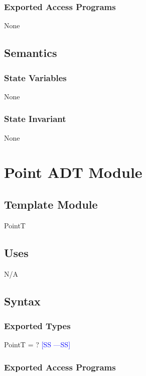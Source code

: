\documentclass[12pt]{article}
\newcommand{\authornote}[3]{\textcolor{#1}{[#3 ---#2]}}
\newcommand{\authornote}[3]{}
\newcommand{\wss}[1]{\authornote{blue}{SS}{#1}}
\begin{document}
\subsubsection* {Exported Access Programs}

None

\subsection* {Semantics}

\subsubsection* {State Variables}

None

\subsubsection* {State Invariant}

None

\newpage

\section* {Point ADT Module}

\subsection*{Template Module}

PointT

\subsection* {Uses}

N/A

\subsection* {Syntax}

\subsubsection* {Exported Types}

PointT = ?  \wss{SS}

\subsubsection* {Exported Access Programs}
\end{document}
